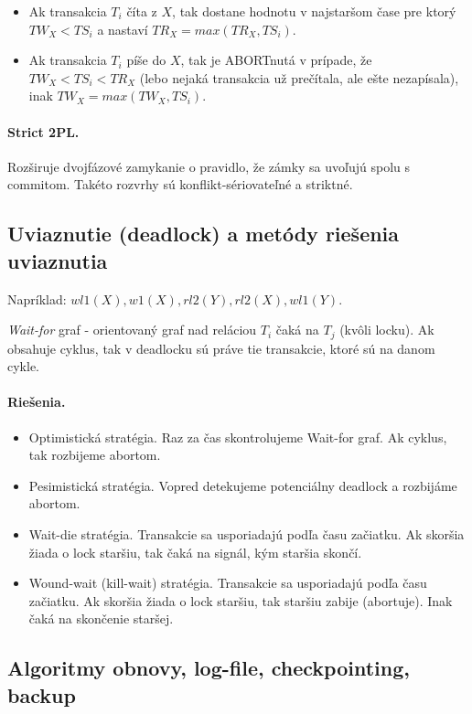 \documentclass[10pt,a4paper]{article}
\begin{document}
\begin{itemize}
\item Ak transakcia $T_i$ číta z $X$, tak dostane hodnotu v najstaršom čase pre ktorý $TW_X < TS_i$ a nastaví $TR_X = max(TR_X, TS_i)$.
\item Ak transakcia $T_i$ píše do $X$, tak je ABORTnutá v prípade, že $TW_X < TS_i < TR_X$ (lebo nejaká transakcia už prečítala, ale ešte nezapísala), inak $TW_X = max(TW_X, TS_i)$.
\end{itemize}

\paragraph{Strict 2PL.}
Rozširuje dvojfázové zamykanie o pravidlo, že zámky sa uvoľujú spolu s commitom. Takéto rozvrhy sú konflikt-sériovateľné a striktné. 


\subsection{Uviaznutie (deadlock) a metódy riešenia uviaznutia}
Napríklad: $wl1(X), w1(X), rl2(Y), rl2(X), wl1(Y)$.

\emph{Wait-for} graf - orientovaný graf nad reláciou $T_i$ čaká na $T_j$ (kvôli locku).
Ak obsahuje cyklus, tak v deadlocku sú práve tie transakcie, ktoré sú na danom cykle. 

\paragraph{Riešenia.}

\begin{itemize}
\item Optimistická stratégia. Raz za čas skontrolujeme Wait-for graf. Ak cyklus, tak rozbijeme abortom. 
\item Pesimistická stratégia. Vopred detekujeme potenciálny deadlock a rozbijáme abortom.  
\item Wait-die stratégia. Transakcie sa usporiadajú podľa času začiatku. Ak skoršia žiada o lock staršiu, tak čaká na signál, kým staršia skončí. 
\item Wound-wait (kill-wait) stratégia. Transakcie sa usporiadajú podľa času začiatku. Ak skoršia žiada o lock staršiu, tak staršiu zabije (abortuje). Inak čaká na skončenie staršej. 
\end{itemize}

\subsection{Algoritmy obnovy, log-file, checkpointing, backup}
    
\end{document}
